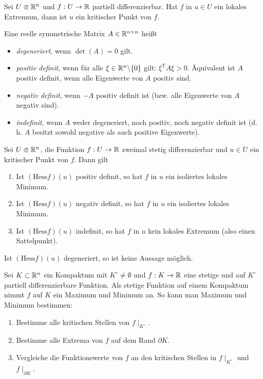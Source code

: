 \documentclass{cheat-sheet}
\begin{document}
\begin{satz}
Sei $U \opn \R^n$ und $f : U \to \mathbb{R}$ partiell differenzierbar. Hat $f$ in $u \in U$ ein lokales Extremum, dann ist $u$ ein kritischer Punkt von $f$.
\end{satz}

\begin{defn}
Eine reelle symmetrische Matrix $A \in \mathbb{R}^{n \times n}$ heißt
\begin{itemize}
  \item \emph{degeneriert}, wenn $\det(A) = 0$ gilt.
  \item \emph{positiv definit}, wenn für alle $\xi \in \mathbb{R}^n \backslash \{ 0 \}$ gilt: $\xi^{\text{T}}A\xi > 0.$ Äquivalent ist $A$ positiv definit, wenn alle Eigenwerte von $A$ positiv sind.
  \item \emph{negativ definit}, wenn $-A$ positiv definit ist (bzw. alle Eigenwerte von $A$ negativ sind).
  \item \emph{indefinit}, wenn $A$ weder degeneriert, noch positiv, noch negativ definit ist (d.\,h. $A$ besitzt sowohl negative als auch positive Eigenwerte).
\end{itemize}
\end{defn}

\begin{satz}
Sei $U \opn \R^n$, die Funktion $f : U \to \mathbb{R}$ zweimal stetig differenzierbar und $u \in U$ ein kritischer Punkt von $f$. Dann gilt
\begin{enumerate}
  \item Ist $(\mathrm{Hess} f)(u)$ positiv definit, so hat $f$ in $u$ ein isoliertes lokales Minimum.
  \item Ist $(\mathrm{Hess} f)(u)$ negativ definit, so hat $f$ in $u$ ein isoliertes lokales Minimum.
  \item Ist $(\mathrm{Hess} f)(u)$ indefinit, so hat $f$ in $u$ kein lokales Extremum (also einen Sattelpunkt).
\end{enumerate}
\end{satz}

\begin{acht}
Ist $(\mathrm{Hess} f)(u)$ degeneriert, so ist keine Aussage möglich.
\end{acht}

\begin{strat}
Sei $K \subset \mathbb{R}^n$ ein Kompaktum mit $K^{\circ} \not= \emptyset$ und $f : K \to \mathbb{R}$ eine stetige und auf $K^{\circ}$ partiell differenzierbare Funktion. Als stetige Funktion auf einem Kompaktum nimmt $f$ auf $K$ ein Maximum und Minimum an. So kann man Maximum und Minimum bestimmen:
\begin{enumerate}
  \item Bestimme alle kritischen Stellen von $f\mid_{K^{\circ}}$.
  \item Bestimme alle Extrema von $f$ auf dem Rand $\partial K$.
  \item Vergleiche die Funktionswerte von $f$ an den kritischen Stellen in $f\mid_{K^{\circ}}$ und $f\mid_{\partial K}$.
\end{enumerate}
\end{strat}
\end{document}
